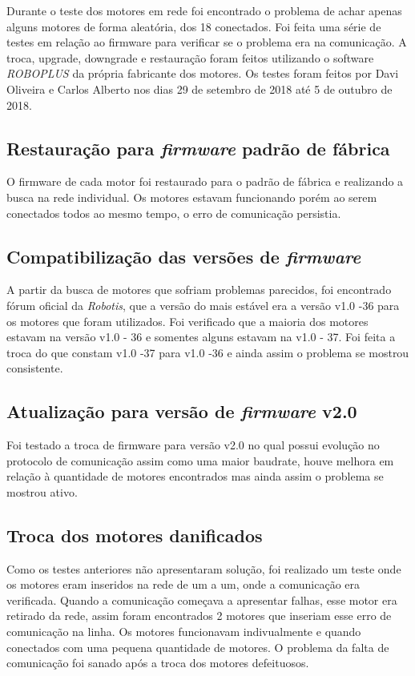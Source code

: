 Durante o teste dos motores em rede foi encontrado o problema de achar apenas alguns motores de forma aleatória,  dos 18 conectados. Foi feita uma série de testes em relação ao firmware para verificar se o problema era na comunicação. A troca, upgrade, downgrade e restauração foram feitos utilizando o software \textit{ROBOPLUS} da própria fabricante dos motores. Os testes foram feitos por Davi Oliveira e Carlos Alberto nos dias 29 de setembro de 2018 até 5 de outubro de 2018.

\subsection{Restauração para \textit{firmware} padrão de fábrica}
O firmware de cada motor foi restaurado para o padrão de fábrica e realizando a busca na rede individual. Os motores estavam funcionando porém ao serem conectados todos ao mesmo tempo, o erro de comunicação persistia.

\subsection{Compatibilização das versões de \textit{firmware}}
A partir da busca de motores que sofriam problemas parecidos, foi encontrado fórum oficial da \textit{Robotis}, que a versão do mais estável era a versão v1.0 -36 para os motores que foram utilizados.
Foi verificado que a maioria dos motores estavam na versão v1.0 - 36 e somentes alguns estavam na v1.0 - 37. Foi feita a troca do que constam v1.0 -37 para v1.0 -36 e ainda assim o problema se mostrou consistente.

\subsection{Atualização para versão de \textit{firmware} v2.0}
 Foi testado a troca de firmware para versão v2.0 no qual possui evolução no protocolo de comunicação assim como uma maior baudrate, houve melhora em relação à quantidade de motores encontrados mas ainda assim o problema se mostrou ativo.

\subsection{Troca dos motores danificados}
Como os testes anteriores não apresentaram solução, foi realizado um teste onde os motores eram inseridos na rede de um a um, onde a comunicação era verificada. Quando a comunicação começava a apresentar falhas, esse motor era retirado da rede, assim foram encontrados 2 motores que inseriam esse erro de comunicação na linha. Os motores funcionavam indivualmente e quando conectados com uma pequena quantidade de motores. O problema da falta de comunicação foi sanado após a troca dos motores defeituosos.

